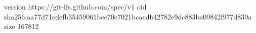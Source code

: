 version https://git-lfs.github.com/spec/v1
oid sha256:aa77d71edefb35459061bce70c7021bcacdb42782e9dc883ba09842f977d839a
size 167812
